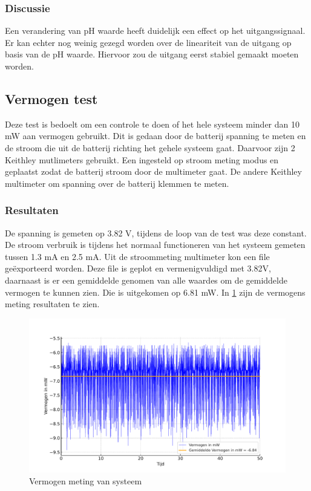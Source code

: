 \subsubsection{Discussie}
Een verandering van pH waarde heeft duidelijk een effect op het uitgangssignaal. Er kan echter nog weinig gezegd worden over de lineariteit van de uitgang op basis van de pH waarde. Hiervoor zou de uitgang eerst stabiel gemaakt moeten worden.



\subsection{Vermogen test}
Deze test is bedoelt om een controle te doen of het hele systeem minder dan 10 mW aan vermogen gebruikt. Dit is gedaan door de batterij spanning te meten en de stroom die uit de batterij richting het gehele systeem gaat. Daarvoor zijn 2 Keithley mutlimeters gebruikt. Een ingesteld op stroom meting modus en geplaatst zodat de batterij stroom door de multimeter gaat. De andere Keithley multimeter om spanning over de batterij klemmen te meten. 

\subsubsection{Resultaten}
De spanning is gemeten op 3.82 V, tijdens de loop van de test was deze constant. De stroom verbruik is tijdens het normaal functioneren van het systeem gemeten tussen 1.3 mA en 2.5 mA. Uit de stroommeting multimeter kon een file geëxporteerd worden. Deze file is geplot en vermenigvuldigd met 3.82V, daarnaast is er een gemiddelde genomen van alle waardes om de gemiddelde vermogen te kunnen zien. Die is uitgekomen op 6.81 mW. In \cref{fig:vermogenMeting} zijn de vermogens meting resultaten te zien.

\begin{figure}[ht]
    \centering
    \includegraphics[width=\textwidth]{img/vermogensMeting.pdf}
    \caption{Vermogen meting van systeem}
    \label{fig:vermogenMeting}
\end{figure}

